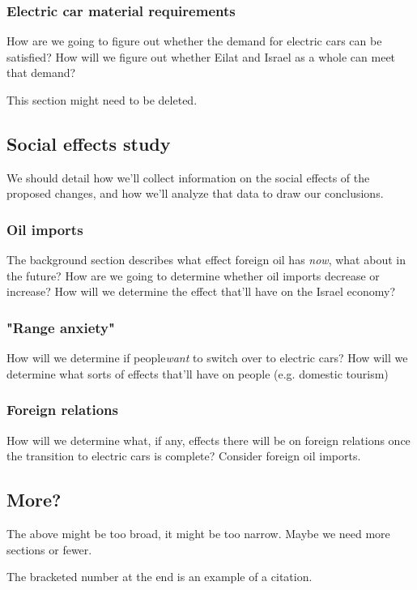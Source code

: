 \documentclass{article}
\begin{document}
\subsubsection{Electric car material requirements}
How are we going to figure out whether the demand for electric cars can be satisfied? How will we figure out
whether Eilat and Israel as a whole can meet that demand?

This section might need to be deleted.

\subsection{Social effects study}
We should detail how we'll collect information on the social effects of the proposed changes, and how we'll
analyze that data to draw our conclusions.

\subsubsection{Oil imports}
The background section describes what effect foreign oil has \textit{now}, what about in the future? How are we
going to determine whether oil imports decrease or increase? How will we determine the effect that'll have on
the Israel economy?

\subsubsection{"Range anxiety"}
How will we determine if people\textit{want} to switch over to electric cars? How will we determine what sorts
of effects that'll have on people (e.g. domestic tourism)

\subsubsection{Foreign relations}
How will we determine what, if any, effects there will be on foreign relations once the transition to electric
cars is complete? Consider foreign oil imports.

\subsection{More?}

The above might be too broad, it might be too narrow. Maybe we need more sections or fewer.

The bracketed number at the end is an example of a citation. \cite{demo:1}

\newpage


\end{document}
